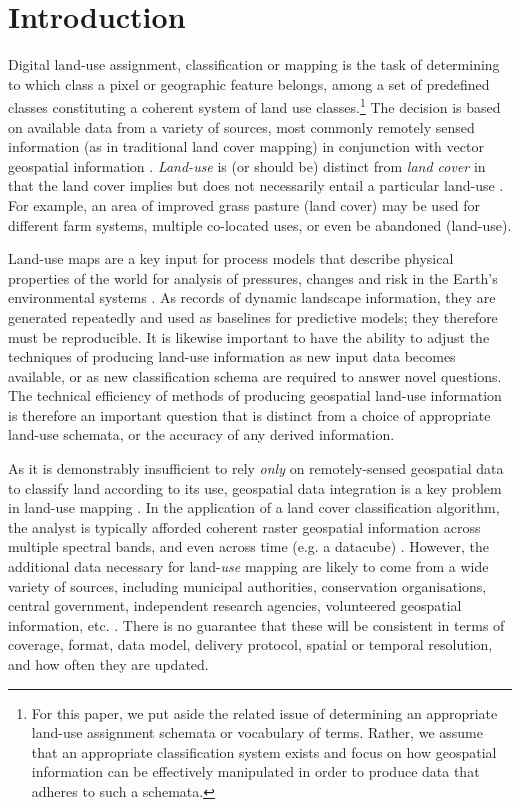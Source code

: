 \documentclass[]{interact}
\theoremstyle{plain}%
\theoremstyle{definition}
\theoremstyle{remark}
\begin{document}
\section{Introduction} %

Digital land-use assignment, classification or mapping is the task of determining to which class a pixel or geographic feature belongs, among a set of predefined classes constituting a coherent system of land use classes.\footnote{For this paper, we put aside the related issue of determining an appropriate land-use assignment schemata or vocabulary of terms. Rather, we assume that an appropriate classification system exists and focus on how geospatial information can be effectively manipulated in order to produce data that adheres to such a schemata.} The decision is based on available data from a variety of sources, most commonly remotely sensed information (as in traditional land cover mapping) in conjunction with vector geospatial information \citep{rozenstein2011comparison}. \textit{Land-use} is (or should be) distinct from \textit{land cover} in that the land cover implies but does not necessarily entail a particular land-use \citep{fisher2005land,cihlar2001land}. For example, an area of improved grass pasture (land cover) may be used for different farm systems, multiple co-located uses, or even be abandoned (land-use).

Land-use maps are a key input for process models that describe physical properties of the world for analysis of pressures, changes and risk in the Earth's environmental systems \citep{bach2006accuracy,stehman1998design}. As records of dynamic landscape information, they are generated repeatedly and used as baselines for predictive models; they therefore must be reproducible. It is likewise important to have the ability to adjust the techniques of producing land-use information as new input data becomes available, or as new classification schema are required to answer novel questions. The technical efficiency of methods of producing geospatial land-use information is therefore an important question that is distinct from a choice of appropriate land-use schemata, or the accuracy of any derived information.

As it is demonstrably insufficient to rely \textit{only} on remotely-sensed geospatial data to classify land according to its use, geospatial data integration is a key problem in land-use mapping \citep{lillesand2015remote}. In the application of a land cover classification algorithm, the analyst is typically afforded coherent raster geospatial information across multiple spectral bands, and even across time (e.g. a datacube) \citep{kopp2019achieving}. However, the additional data necessary for land-\textit{use} mapping are likely to come from a wide variety of sources, including municipal authorities, conservation organisations, central government, independent research agencies, volunteered geospatial information, etc. \citep{rozenstein2011comparison}. There is no guarantee that these will be consistent in terms of coverage, format, data model, delivery protocol, spatial or temporal resolution, and how often they are updated.
\end{document}
